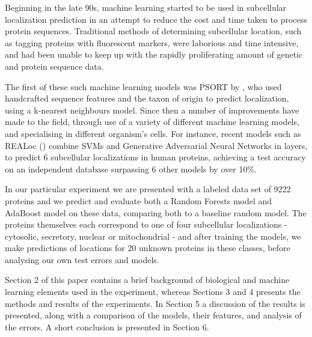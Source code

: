 \documentclass{bioinfo}
\begin{document}
Beginning in the late 90s, machine learning started to be used in subcellular localization prediction in an attempt to reduce the cost and time taken to process protein sequences.  
Traditional methods of determining subcellular location, such as tagging proteins with fluorescent markers, were laborious and time intensive, and had been unable to keep up with the rapidly proliferating amount of genetic and protein sequence data. 

The first of these such machine learning models was PSORT by \cite{Nakai}, who used handcrafted sequence features and the taxon of origin to predict localization, using a k-nearest neighbours model.  Since then a number of improvements have made to the field, through use of a variety of different machine learning models, and specialising in different organism's cells. For instance, recent models such as REALoc (\cite{Tung}) combine SVMs and Generative Adversarial Neural Networks in layers, to predict 6 subcellular localizations in human proteins, achieving a test accuracy on an independent database surpassing 6 other models by over 10\%.



In our particular experiment we are presented with a labeled data set of 9222 proteins and we predict and evaluate both a Random Forests model and AdaBoost model on these data, comparing both to a baseline random model.
The proteins themselves each correspond to one of four subcellular localizations - cytosolic, secretory, nuclear or mitochondrial - and after training the models, we make predictions of locations for 20 unknown proteins in these classes, before analysing our own test errors and models. 

Section 2 of this paper contains a brief background of biological and machine learning elements used in the experiment, whereas Sections 3 and 4 presents the methods and results of the experiments. In Section 5 a discussion of the results is presented, along with a comparison of the models, their features, and analysis of the errors. A short conclusion is presented in Section 6.
\end{document}
